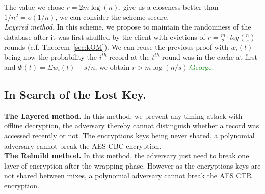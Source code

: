 \documentclass[USenglish,oneside,twocolumn]{article}
\newcommand{\george}[1]{\textcolor{green}{George: #1}}
\begin{document}
The value we chose $r=2m\log(n)$, give us a closeness better than $1/n^2 = o(1/n)$, we can consider the scheme secure.\\

\noindent\textit{Layered method.}
In this scheme, we propose to maintain the randomness of the database after it was first shuffled by the client with evictions of $r=\frac{m}{2} \cdot log\left ( \frac{n}{s} \right )$ rounds (c.f. Theorem~\ref{sec:kOM}).
We can reuse the previous proof with $w_i(t)$ being now the probability the $i^{th}$ record at the $t^{th}$ round was in the cache at first and $\Phi(t)=\Sigma w_i(t) - s/n$, we obtain $r>m\log(n/s)$.\george{}

\vspace{-.5cm}

\subsection{In Search of the Lost Key.}
 
\noindent\textbf{The Layered method.}
In this method, we prevent any timing attack with offline decryption, the adversary thereby cannot distinguish whether a record was accessed recently or not. The encryptions keys being never shared, a polynomial adversary cannot break the AES CBC encryption.\\

\noindent\textbf{The Rebuild method.}
In this method, the adversary just need to break one layer of encryption after the wrapping phase. However as the encryptions keys are not shared between mixes, a polynomial adversary cannot break the AES CTR encryption.
\end{document}
